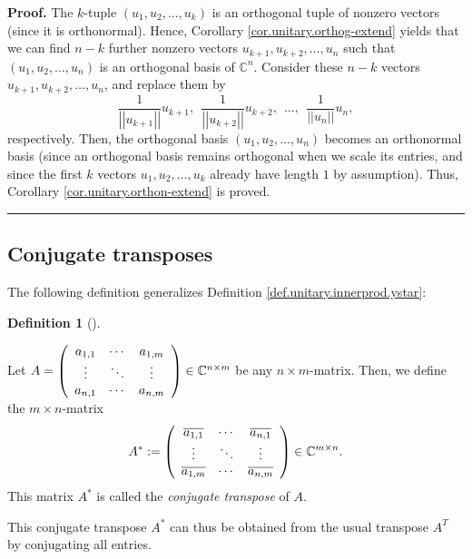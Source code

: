 \documentclass[numbers=enddot,12pt,final,onecolumn,notitlepage]{scrartcl}%
\numberwithin{exer}{subsection}
\theoremstyle{definition}
\newtheorem{defi}[theo]{Definition}
\newenvironment{definition}[1][]
{\begin{defi}[#1]\begin{leftbar}}
{\end{leftbar}\end{defi}}
\newenvironment{proof}[1][Proof]{\noindent\textbf{#1.} }{\ \rule{0.5em}{0.5em}}
\begin{document}
\begin{proof}
The $k$-tuple $\left(  u_{1},u_{2},\ldots,u_{k}\right)  $ is an orthogonal
tuple of nonzero vectors (since it is orthonormal). Hence, Corollary
\ref{cor.unitary.orthog-extend} yields that we can find $n-k$ further nonzero
vectors $u_{k+1},u_{k+2},\ldots,u_{n}$ such that $\left(  u_{1},u_{2}%
,\ldots,u_{n}\right)  $ is an orthogonal basis of $\mathbb{C}^{n}$. Consider
these $n-k$ vectors $u_{k+1},u_{k+2},\ldots,u_{n}$, and replace them by%
\[
\dfrac{1}{\left\vert \left\vert u_{k+1}\right\vert \right\vert }%
u_{k+1},\ \ \dfrac{1}{\left\vert \left\vert u_{k+2}\right\vert \right\vert
}u_{k+2},\ \ \ldots,\ \ \dfrac{1}{\left\vert \left\vert u_{n}\right\vert
\right\vert }u_{n},
\]
respectively. Then, the orthogonal basis $\left(  u_{1},u_{2},\ldots
,u_{n}\right)  $ becomes an orthonormal basis (since an orthogonal basis
remains orthogonal when we scale its entries, and since the first $k$ vectors
$u_{1},u_{2},\ldots,u_{k}$ already have length $1$ by assumption). Thus,
Corollary \ref{cor.unitary.orthon-extend} is proved.
\end{proof}

\subsection{Conjugate transposes}

The following definition generalizes Definition
\ref{def.unitary.innerprod.ystar}:

\begin{definition}
\label{def.unitary.innerprod.A*}Let $A=\left(
\begin{array}
[c]{ccc}%
a_{1,1} & \cdots & a_{1,m}\\
\vdots & \ddots & \vdots\\
a_{n,1} & \cdots & a_{n,m}%
\end{array}
\right)  \in\mathbb{C}^{n\times m}$ be any $n\times m$-matrix. Then, we define
the $m\times n$-matrix%
\[
A^{\ast}:=\left(
\begin{array}
[c]{ccc}%
\overline{a_{1,1}} & \cdots & \overline{a_{n,1}}\\
\vdots & \ddots & \vdots\\
\overline{a_{1,m}} & \cdots & \overline{a_{n,m}}%
\end{array}
\right)  \in\mathbb{C}^{m\times n}.
\]
This matrix $A^{\ast}$ is called the \emph{conjugate transpose} of $A$.
\end{definition}

This conjugate transpose $A^{\ast}$ can thus be obtained from the usual
transpose $A^{T}$ by conjugating all entries.
\end{document}
